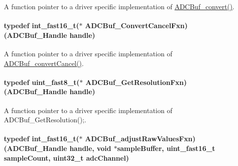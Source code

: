 A function pointer to a driver specific implementation of \hyperlink{_a_d_c_buf_8h_a762253a94875258c5a71b591f03f9d97}{A\+D\+C\+Buf\+\_\+convert()}. 

\paragraph[{A\+D\+C\+Buf\+\_\+\+Convert\+Cancel\+Fxn}]{\setlength{\rightskip}{0pt plus 5cm}typedef int\+\_\+fast16\+\_\+t($\ast$ A\+D\+C\+Buf\+\_\+\+Convert\+Cancel\+Fxn) ({\bf A\+D\+C\+Buf\+\_\+\+Handle} handle)}\label{_a_d_c_buf_8h_a88bb1333e07a3fee27926064058d5d1b}


A function pointer to a driver specific implementation of \hyperlink{_a_d_c_buf_8h_a5201c27bddf11b9f9ae902807bded40d}{A\+D\+C\+Buf\+\_\+convert\+Cancel()}. 

\paragraph[{A\+D\+C\+Buf\+\_\+\+Get\+Resolution\+Fxn}]{\setlength{\rightskip}{0pt plus 5cm}typedef uint\+\_\+fast8\+\_\+t($\ast$ A\+D\+C\+Buf\+\_\+\+Get\+Resolution\+Fxn) ({\bf A\+D\+C\+Buf\+\_\+\+Handle} handle)}\label{_a_d_c_buf_8h_aeff0bfa20eb16c3857b5123da136d320}


A function pointer to a driver specific implementation of A\+D\+C\+Buf\+\_\+\+Get\+Resolution();. 

\paragraph[{A\+D\+C\+Buf\+\_\+adjust\+Raw\+Values\+Fxn}]{\setlength{\rightskip}{0pt plus 5cm}typedef int\+\_\+fast16\+\_\+t($\ast$ A\+D\+C\+Buf\+\_\+adjust\+Raw\+Values\+Fxn) ({\bf A\+D\+C\+Buf\+\_\+\+Handle} handle, void $\ast$sample\+Buffer, uint\+\_\+fast16\+\_\+t sample\+Count, uint32\+\_\+t adc\+Channel)}\label{_a_d_c_buf_8h_a4a19f2deb010ca0ba5bdcf5586a8cb28}


